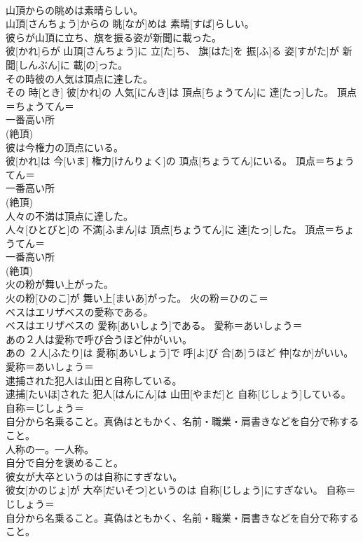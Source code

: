 \documentclass[8pt]{extreport}
\begin{document}
\begin{CJK}{UTF8}{min}
{\\	山頂からの眺めは素晴らしい。	
\\	山頂[さんちょう]からの 眺[なが]めは 素晴[すば]らしい。	
\\	彼らが山頂に立ち、旗を振る姿が新聞に載った。	
\\	彼[かれ]らが 山頂[さんちょう]に 立[た]ち、 旗[はた]を 振[ふ]る 姿[すがた]が 新聞[しんぶん]に 載[の]った。	
\\	その時彼の人気は頂点に達した。	
\\	その 時[とき] 彼[かれ]の 人気[にんき]は 頂点[ちょうてん]に 達[たっ]した。	頂点＝ちょうてん＝　
\\	一番高い所
\\	(絶頂) 
\\	彼は今権力の頂点にいる。	
\\	彼[かれ]は 今[いま] 権力[けんりょく]の 頂点[ちょうてん]にいる。	頂点＝ちょうてん＝　
\\	一番高い所
\\	(絶頂) 
\\	人々の不満は頂点に達した。	
\\	人々[ひとびと]の 不満[ふまん]は 頂点[ちょうてん]に 達[たっ]した。	頂点＝ちょうてん＝　
\\	一番高い所
\\	(絶頂) 
\\	火の粉が舞い上がった。	
\\	火の粉[ひのこ]が 舞い上[まいあ]がった。	火の粉＝ひのこ＝ 
\\	ベスはエリザベスの愛称である。	
\\	ベスはエリザベスの 愛称[あいしょう]である。	愛称＝あいしょう＝ 
\\	あの２人は愛称で呼び合うほど仲がいい。	
\\	あの ２人[ふたり]は 愛称[あいしょう]で 呼[よ]び 合[あ]うほど 仲[なか]がいい。	愛称＝あいしょう＝ 
\\	逮捕された犯人は山田と自称している。	
\\	逮捕[たいほ]された 犯人[はんにん]は 山田[やまだ]と 自称[じしょう]している。	自称＝じしょう＝ 
\\	自分から名乗ること。真偽はともかく、名前・職業・肩書きなどを自分で称すること。 
\\	人称の一。一人称。 
\\	自分で自分を褒めること。
\\	彼女が大卒というのは自称にすぎない。	
\\	彼女[かのじょ]が 大卒[だいそつ]というのは 自称[じしょう]にすぎない。	自称＝じしょう＝ 
\\	自分から名乗ること。真偽はともかく、名前・職業・肩書きなどを自分で称すること。 
}
\end{CJK}
\end{document}
